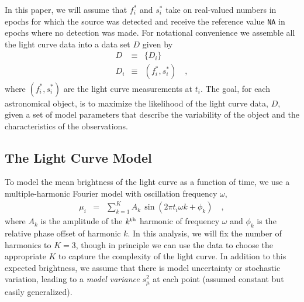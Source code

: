 \documentclass[12pt,preprint]{aastex}
\newcommand{\fobs}{f_i^*}
\newcommand{\sobs}{s_i^*}
\begin{document}
In this paper, we will assume that $\fobs$ and $\sobs$ take on real-valued numbers in epochs for which the source was detected and receive the reference value {\tt NA} in epochs where no detection was made. For notational convenience we assemble all the light curve data into a data set $D$ given by
\begin{eqnarray}\displaystyle
D &\equiv& \{D_i\}
\\
D_i &\equiv& (\fobs, \sobs)
\quad ,
\end{eqnarray}
where $(\fobs, \sobs)$ are the light curve measurements  at $t_i$.  The goal, for each astronomical object, is to maximize the likelihood of the light curve data, $D$, given a set of model parameters that describe the variability of the object and the characteristics of the observations.


\subsection{The Light Curve Model}

To model the mean brightness of the light curve as a function of time, we use a multiple-harmonic Fourier model with oscillation frequency $\omega$,
\begin{eqnarray}\displaystyle
\mu_i &=& \sum_{k=1}^K A_k\, \sin (2 \pi t_i \omega  k + \phi_k)
\quad ,
\end{eqnarray}
where $A_k$ is the amplitude of the $k^{\rm th}$ harmonic of frequency $\omega$ and $\phi_k$ is the relative phase offset of harmonic $k$.  In this analysis, we will fix the number of harmonics to $K=3$, though in principle we can use the data to choose the appropriate $K$ to capture the complexity of the light curve.  In addition to this expected brightness, we assume that there is model uncertainty or stochastic variation, leading to a \emph{model variance} $s_\mu^2$ at each point (assumed constant but easily generalized).
\end{document}
